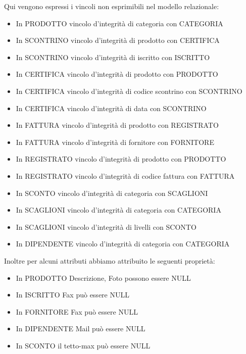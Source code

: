 Qui vengono espressi i vincoli non esprimibili nel modello relazionale:
\begin{itemize}
\item In PRODOTTO vincolo d'integrit\`a di categoria con CATEGORIA
\item In SCONTRINO vincolo d'integrit\`a di prodotto con CERTIFICA
\item In SCONTRINO vincolo d'integrit\`a di iscritto con ISCRITTO
\item In CERTIFICA vincolo d'integrit\`a di prodotto con PRODOTTO
\item In CERTIFICA vincolo d'integrit\`a di codice scontrino con SCONTRINO
\item In CERTIFICA vincolo d'integrit\`a di data con SCONTRINO
\item In FATTURA vincolo d'integrit\`a di prodotto con REGISTRATO
\item In FATTURA vincolo d'integrit\`a di fornitore con FORNITORE
\item In REGISTRATO vincolo d'integrit\`a di prodotto con PRODOTTO
\item In REGISTRATO vincolo d'integrit\`a di codice fattura con FATTURA
\item In SCONTO vincolo d'integrit\`a di categoria con SCAGLIONI
\item In SCAGLIONI vincolo d'integrit\`a di categoria con CATEGORIA
\item In SCAGLIONI vincolo d'integrit\`a di livelli con SCONTO
\item In DIPENDENTE vincolo d'integrit\`a di categoria con CATEGORIA \\

\end{itemize}

Inoltre per alcuni attributi abbiamo attribuito le seguenti propriet\`a:
\begin{itemize}
\item In PRODOTTO Descrizione, Foto possono essere NULL
\item In ISCRITTO Fax pu\`o essere NULL
\item In FORNITORE Fax pu\`o essere NULL
\item In DIPENDENTE Mail pu\`o essere NULL
\item In SCONTO il tetto-max pu\`o essere NULL

\end{itemize}


